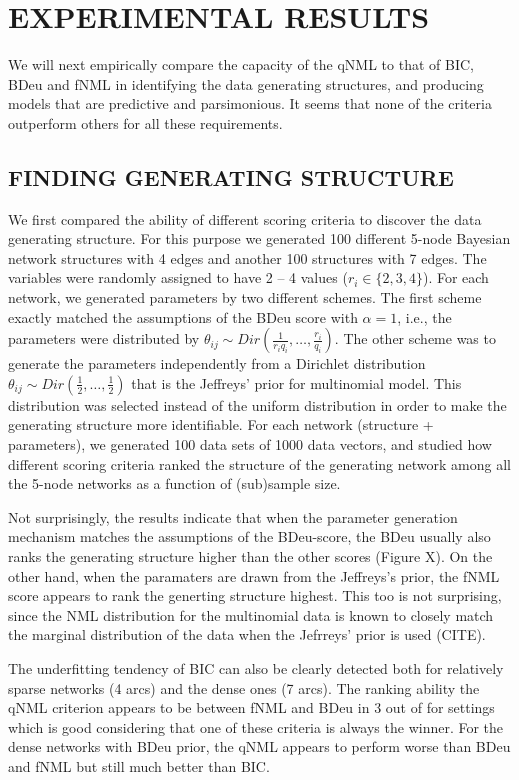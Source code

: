 \section{EXPERIMENTAL RESULTS}

We will next empirically compare the capacity of the qNML to that of
BIC, BDeu and fNML in identifying the data generating structures,
and producing models that are predictive and parsimonious.
It seems that none of the criteria outperform others for all
these requirements. 

\subsection{FINDING GENERATING STRUCTURE}

We first compared the ability of different scoring criteria to
discover the data generating structure. For this purpose we generated
100 different 5-node Bayesian network structures with 4 edges and
another 100 structures with 7 edges.  The variables were randomly
assigned to have 2 – 4 values ($r_i \in \{2, 3, 4\}$). For each
network, we generated parameters by two different schemes. The first
scheme exactly matched the assumptions of the BDeu score with $\alpha
= 1$, i.e., the parameters were distributed by $\theta_{ij} \sim
Dir(\frac{1}{r_iq_i},\ldots,\frac{r_i}{q_i})$. The other scheme was
to generate the parameters independently from a Dirichlet distribution
$\theta_{ij} \sim Dir(\frac{1}{2},\ldots, \frac{1}{2})$ that is the
Jeffreys' prior for multinomial model. This distribution was selected
instead of the uniform distribution in order to make the generating
structure more identifiable.  For each network (structure +
parameters), we generated 100 data sets of 1000 data vectors, and
studied how different scoring criteria ranked the structure of the
generating network among all the 5-node networks as a function of
(sub)sample size.

Not surprisingly, the results indicate that when the parameter generation
mechanism matches the assumptions of the BDeu-score, the BDeu usually
also ranks the generating structure higher than the other scores
(Figure X).  On the other hand, when the paramaters are drawn from the
Jeffreys's prior, the fNML score appears to rank the generting structure
highest. This too is not surprising, since the NML distribution for the
multinomial data is known to closely match the marginal distribution of
the data when the Jefrreys' prior is used (CITE).

The underfitting tendency of BIC can also be clearly detected both for
relatively sparse networks (4 arcs) and the dense ones (7 arcs). The
ranking ability the qNML criterion appears to be between fNML and BDeu
in 3 out of for settings which is good considering that one of these
criteria is always the winner. For the dense networks with BDeu prior,
the qNML appears to perform worse than BDeu and fNML but still much
better than BIC.

